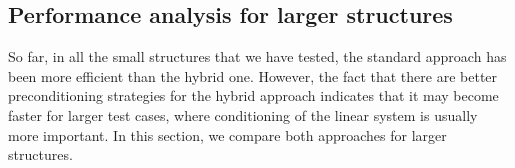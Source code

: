 
\subsection*{\sffamily \large Performance analysis for larger structures}

So far, in all the small structures that we have tested, the standard approach has been more efficient than the hybrid one.
However, the fact that there are better preconditioning strategies for the hybrid approach indicates that it may become faster for larger test cases, where conditioning of the linear system is usually more important. 
In this section, we compare both approaches for larger structures.
